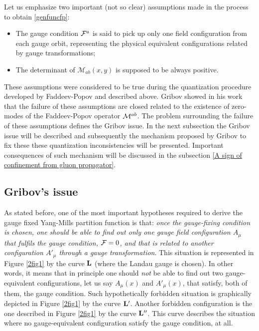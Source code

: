 Let us emphasize two important (not so clear) assumptions made in the process to obtain
\eqref{genfuncfp}:
\begin{itemize}
\item The gauge condition ${\cal F}^{a}$ is said to pick up only one field configuration from each gauge orbit, representing the physical equivalent configurations related by gauge transformations;

\item The determinant of $\mathcal M_{ab} (x,y)$ is supposed to be always positive.
\end{itemize}
These assumptions were considered to be true during the quantization procedure developed by
Faddeev-Popov and described above. Gribov showed in his work \cite{Gribov:1977wm} that the
failure of these assumptions are closed related to the existence of zero-modes of the
Faddeev-Popov operator ${\cal M}^{ab}$. The problem surrounding the failure of these
assumptions defines the Gribov issue. In the next subsection the Gribov issue will be
described and subsequently the mechanism proposed by Gribov to fix these these quantization
inconsistencies will be presented. Important consequences of such mechanism will be discussed
in the subsection \eqref{A sign of confinement from gluon propagator}.















\subsection{Gribov's issue}
\label{Gribov's issue}

As stated before, one of the most important hypotheses required to derive the gauge fixed
Yang-Mills partition function is that: {\it once the gauge-fixing condition
is chosen, one should be able to find out only one gauge field configuration $A_{\mu}$ that
fulfils the gauge condition, ${\cal F}=0$, and that is related to another configuration
$A'_{\mu}$ through a gauge transformation}. This situation is represented in Figure \ref{2fig1}
by the curve $\bf L$ (where the Landau gauge is chosen). In other words, it means that in
principle one should {\it not} be able to find out two gauge-equivalent configurations, let us
say $A_{\mu}(x)$ and $A'_{\mu}(x)$, that satisfy, both of them, the gauge condition. Such
hypothetically forbidden situation is graphically depicted in Figure \ref{2fig1} by the curve
${\bf L}'$. Another forbidden configuration is the one described in Figure \ref{2fig1} by the
curve ${\bf L}''$. This curve describes the situation where no gauge-equivalent configuration
satisfy the gauge condition, at all.




